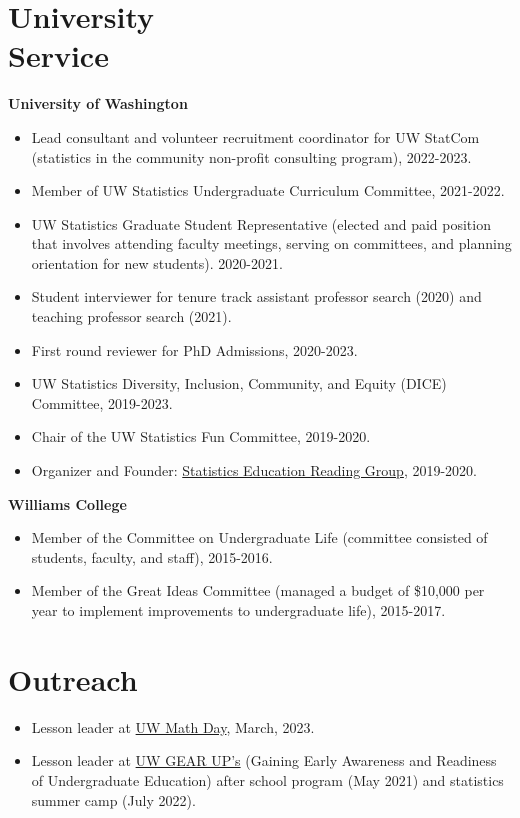 \documentclass[margin, 10pt]{res}
\begin{document}
\begin{resume}
\section{University \\ Service}
\textbf{University of Washington}
\begin{itemize}
\item Lead consultant and volunteer recruitment coordinator for UW StatCom (statistics in the community non-profit consulting program), 2022-2023. 
\item Member of UW Statistics Undergraduate Curriculum Committee, 2021-2022. 
 \item UW Statistics Graduate Student Representative (elected and paid position that involves attending faculty meetings, serving on committees, and planning orientation for new students). 2020-2021.
 \item Student interviewer for tenure track assistant professor search (2020) and teaching professor search (2021). 
\item First round reviewer for PhD Admissions, 2020-2023. 
\item UW Statistics Diversity, Inclusion, Community, and Equity (DICE) Committee, 2019-2023.   
\item Chair of the UW Statistics Fun Committee, 2019-2020.
  \item Organizer and Founder: \href{https://pearce790.github.io/statedrg.html}{Statistics Education Reading Group}, 2019-2020.
 \end{itemize}
 \textbf{Williams College}
 \begin{itemize}
\item Member of the Committee on Undergraduate Life (committee consisted of students, faculty, and staff), 2015-2016.
\item Member of the Great Ideas Committee (managed a budget of \$10,000 per year to implement improvements to undergraduate life), 2015-2017.
\end{itemize}
 
\section{Outreach}
\begin{itemize}
   \item Lesson leader at \href{https://math.washington.edu/events/2023-03-20/uw-math-day}{UW Math Day}, March, 2023. 
  \item Lesson leader at \href{https://depts.washington.edu/gearupac/}{UW GEAR UP's} (Gaining Early Awareness and Readiness of Undergraduate Education) after school program (May 2021) and statistics summer camp (July 2022). 
\end{itemize}
%

\end{resume}
\end{document}
